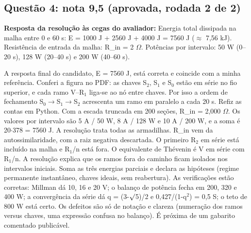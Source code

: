 \documentclass{article}%
\begin{document}
\subsection*{Questão 4: nota 9,5 (aprovada, rodada 2 de 2)}%
\textbf{Resposta da resolução às cegas do avaliador:} Energia total dissipada na malha entre 0 e 60 s: E = 1000 J + 2560 J + 4000 J = 7560 J ($\approx$ 7,56 kJ). Resistência de entrada da malha: R\_in = 2 $\Omega$. Potências por intervalo: 50 W (0--20 s), 128 W (20--40 s) e 200 W (40--60 s).\par %
A resposta final do candidato, E = 7560 J, está correta e coincide com a minha referência. Conferi a figura no PDF: as chaves S$_{2}$, S$_{1}$ e S$_{0}$ estão em série no fio superior, e cada ramo V--R$_{1}$ liga{-}se ao nó entre chaves. Por isso a ordem de fechamento S$_{0}$$\to$S$_{1}$$\to$S$_{2}$ acrescenta um ramo em paralelo a cada 20 s. Refiz as contas em Python. Com a escada truncada em 200 seções, R\_in = 2,000 $\Omega$. Os valores por intervalo são 5 A / 50 W, 8 A / 128 W e 10 A / 200 W, e a soma é 20$\cdot$378 = 7560 J. A resolução trata todas as armadilhas. R\_in vem da autossimilaridade, com a raiz negativa descartada. O primeiro R$_{2}$ em série está incluído na malha e R$_{1}$/n está fora. O equivalente de Thévenin é V em série com R$_{1}$/n. A resolução explica que os ramos fora do caminho ficam isolados nos intervalos iniciais. Soma as três energias parciais e declara as hipóteses (regime permanente instantâneo, chaves ideais, sem reabertura). As verificações estão corretas: Millman dá 10, 16 e 20 V; o balanço de potência fecha em 200, 320 e 400 W; a convergência da série dá q = (3-$\surd$5)/2 e 0,427/(1-q$^2$) = 0,5 S; o teto de 800 W está certo. Os defeitos são só de notação e clareza (numeração dos ramos versus chaves, uma expressão confusa no balanço). É próxima de um gabarito comentado publicável.%
\end{document}
